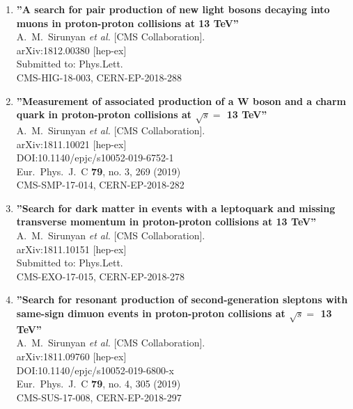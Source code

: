 \begin{enumerate}
\item%
{\bf ''A search for pair production of new light bosons decaying into muons in proton-proton collisions at 13 TeV''}
  \\{}A.~M.~Sirunyan {\it et al.} [CMS Collaboration].
  \\{}arXiv:1812.00380 [hep-ex]
  \\{}Submitted to: Phys.Lett.
  \\{}CMS-HIG-18-003, CERN-EP-2018-288

\item%
{\bf ''Measurement of associated production of a W boson and a charm quark in proton-proton collisions at $\sqrt{s} =$ 13 TeV''}
  \\{}A.~M.~Sirunyan {\it et al.} [CMS Collaboration].
  \\{}arXiv:1811.10021 [hep-ex]
  \\{}DOI:10.1140/epjc/s10052-019-6752-1
  \\{}Eur.\ Phys.\ J.\ C {\bf 79}, no. 3, 269 (2019)
  \\{}CMS-SMP-17-014, CERN-EP-2018-282

\item%
{\bf ''Search for dark matter in events with a leptoquark and missing transverse momentum in proton-proton collisions at 13 TeV''}
  \\{}A.~M.~Sirunyan {\it et al.} [CMS Collaboration].
  \\{}arXiv:1811.10151 [hep-ex]
  \\{}Submitted to: Phys.Lett.
  \\{}CMS-EXO-17-015, CERN-EP-2018-278

\item%
{\bf ''Search for resonant production of second-generation sleptons with same-sign dimuon events in proton-proton collisions at $\sqrt{s} =$ 13 TeV''}
  \\{}A.~M.~Sirunyan {\it et al.} [CMS Collaboration].
  \\{}arXiv:1811.09760 [hep-ex]
  \\{}DOI:10.1140/epjc/s10052-019-6800-x
  \\{}Eur.\ Phys.\ J.\ C {\bf 79}, no. 4, 305 (2019)
  \\{}CMS-SUS-17-008, CERN-EP-2018-297


\end{enumerate}
